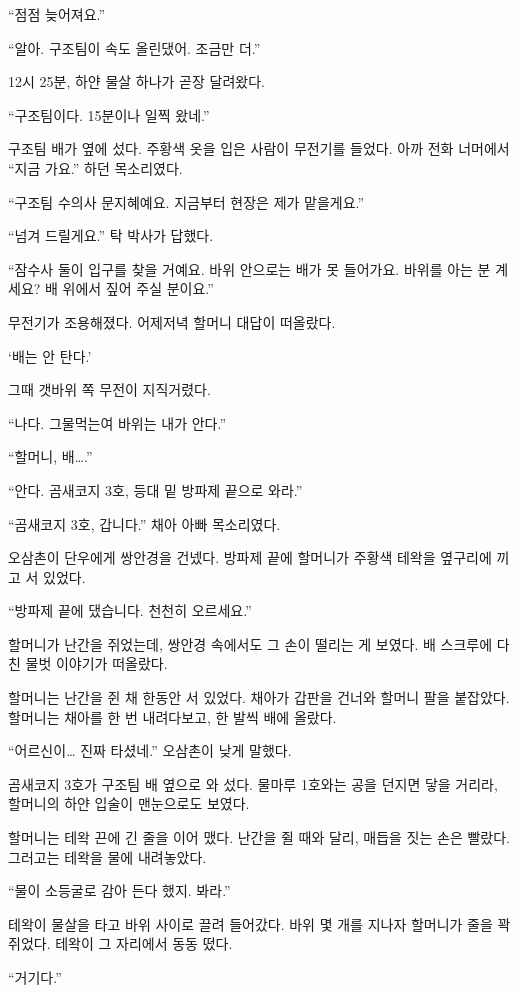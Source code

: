 \documentclass[
  korean,
  letterpaper,
  twoside,
  open=any,
  fontsize=12.5pt,
  headings=small]{scrbook}
\begin{document}
``점점 늦어져요.''

``알아. 구조팀이 속도
올린댔어. 조금만 더.''

12시 25분, 하얀 물살 하나가
곧장 달려왔다.

``구조팀이다. 15분이나 일찍
왔네.''

구조팀 배가 옆에 섰다. 주황색
옷을 입은 사람이 무전기를
들었다. 아까 전화 너머에서
``지금 가요.'' 하던
목소리였다.

``구조팀 수의사 문지혜예요.
지금부터 현장은 제가
맡을게요.''

``넘겨 드릴게요.'' 탁 박사가
답했다.

``잠수사 둘이 입구를 찾을
거예요. 바위 안으로는 배가 못
들어가요. 바위를 아는 분
계세요? 배 위에서 짚어 주실
분이요.''

무전기가 조용해졌다. 어제저녁
할머니 대답이 떠올랐다.

`배는 안 탄다.'

그때 갯바위 쪽 무전이
지직거렸다.

``나다. 그물먹는여 바위는 내가
안다.''

``할머니, 배\ldots.''

``안다. 곰새코지 3호, 등대 밑
방파제 끝으로 와라.''

``곰새코지 3호, 갑니다.'' 채아
아빠 목소리였다.

오삼촌이 단우에게 쌍안경을
건넸다. 방파제 끝에 할머니가
주황색 테왁을 옆구리에 끼고 서
있었다.

``방파제 끝에 댔습니다. 천천히
오르세요.''

할머니가 난간을 쥐었는데,
쌍안경 속에서도 그 손이 떨리는
게 보였다. 배 스크루에 다친
물벗 이야기가 떠올랐다.

할머니는 난간을 쥔 채 한동안
서 있었다. 채아가 갑판을
건너와 할머니 팔을 붙잡았다.
할머니는 채아를 한 번
내려다보고, 한 발씩 배에
올랐다.

``어르신이\ldots{} 진짜
타셨네.'' 오삼촌이 낮게
말했다.

곰새코지 3호가 구조팀 배
옆으로 와 섰다. 물마루 1호와는
공을 던지면 닿을 거리라,
할머니의 하얀 입술이
맨눈으로도 보였다.

할머니는 테왁 끈에 긴 줄을
이어 맸다. 난간을 쥘 때와
달리, 매듭을 짓는 손은 빨랐다.
그러고는 테왁을 물에
내려놓았다.

``물이 소등굴로 감아 든다
했지. 봐라.''

테왁이 물살을 타고 바위 사이로
끌려 들어갔다. 바위 몇 개를
지나자 할머니가 줄을 꽉
쥐었다. 테왁이 그 자리에서
동동 떴다.

``거기다.''
\end{document}
